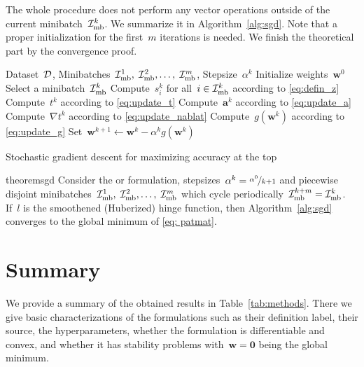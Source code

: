 The whole procedure does not perform any vector operations outside of the current minibatch~$\mathcal{I}_{\text{mb}}^k$. We summarize it in Algorithm~\ref{alg:sgd}. Note that a proper initialization for the first~$m$ iterations is needed. We finish the theoretical part by the convergence proof.

\begin{algorithm}
  \begin{algorithmic}[1]
    \Require Dataset~$\mathcal{D}$, Minibatches~$\mathcal{I}_{\text{mb}}^1,\; \mathcal{I}_{\text{mb}}^2, \ldots, \; \mathcal{I}_{\text{mb}}^m$, Stepsize~$\alpha^k$
    \State Initialize weights~$\bm{w}^0$
    \State Select a minibatch~$\mathcal{I}_{\text{mb}}^k$
    \State Compute~$s_i^k$ for all~$i \in \mathcal{I}_{\text{mb}}^k$ according to \eqref{eq:defin_z}
    \State Compute~$t^k$ according to \eqref{eq:update_t}
    \State Compute~$\bm{a}^k$ according to \eqref{eq:update_a}
    \State Compute~$\nabla t^k$ according to \eqref{eq:update_nablat}
    \State Compute~$g(\bm{w}^k)$ according to \eqref{eq:update_g}
    \State Set~$\bm{w}^{k+1} \gets \bm{w}^k - \alpha^k g(\bm{w}^k)$
    \EndFor
  \end{algorithmic}
  \caption{Stochastic gradient descent for maximizing accuracy at the top}
  \label{alg:sgd}
\end{algorithm}

\begin{restatable}{theorem}{sgd}\label{thm:sgd}
  Consider the \PatMat or \PatMatNP formulation, stepsizes~$\alpha^k = \nicefrac{\alpha^0}{k+1}$ and piecewise disjoint minibatches~$\mathcal{I}_{\text{mb}}^1, \; \mathcal{I}_{\text{mb}}^2, \ldots, \; \mathcal{I}_{\text{mb}}^m$ which cycle periodically~$\mathcal{I}_{\text{mb}}^{k+m} = \mathcal{I}_{\text{mb}}^k$. If~$l$ is the smoothened (Huberized) hinge function, then Algorithm~\ref{alg:sgd} converges to the global minimum of \eqref{eq: patmat}.
\end{restatable}

\section{Summary}

We provide a summary of the obtained results in Table~\ref{tab:methods}. There we give basic characterizations of the formulations such as their definition label, their source, the hyperparameters, whether the formulation is differentiable and convex, and whether it has stability problems with~$\bm{w}=\bm{0}$ being the global minimum. 


